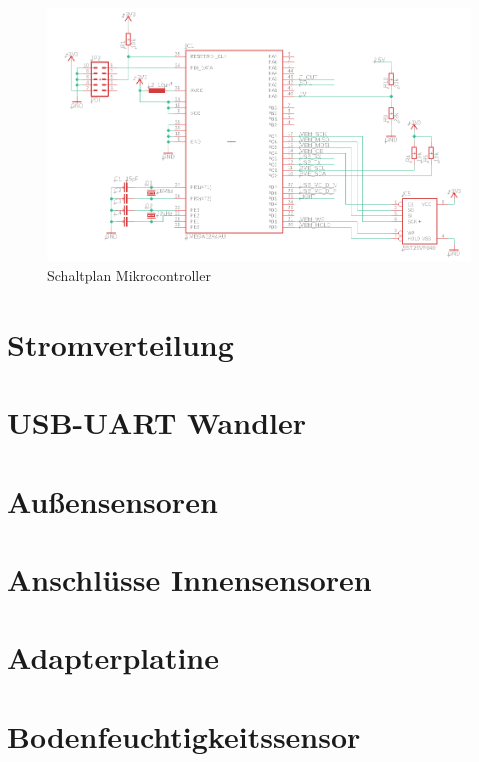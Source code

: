\documentclass[12pt, a4paper, oneside]{report}
\begin{document}
\begin{figure}[h]
	\centering
	\includegraphics[width=1\textwidth]{pic/Microcontroller}
	\caption{Schaltplan Mikrocontroller}
	\label{fig:Microcontroller}
\end{figure}

\section{Stromverteilung}
\label{sec:Stromverteilung}

\section{USB-UART Wandler}
\label{sec:USB-UART Wandler}

\section{Außensensoren}
\label{sec:Außensensoren}

\section{Anschlüsse Innensensoren}
\label{sec:Innensensoren}

\section{Adapterplatine}
\label{sec:Adapterplatine}

\section{Bodenfeuchtigkeitssensor}
\label{sec:Bodenfeuchtigkeitssensor}
\end{document}
